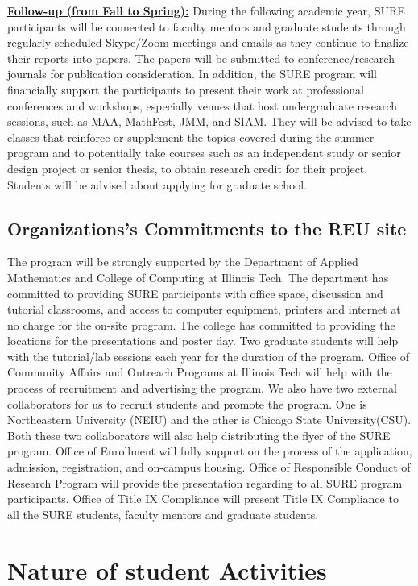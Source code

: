 \documentclass[11pt]{NSFamsart}
\begin{document}
\noindent\textbf{\underline{Follow-up (from Fall to Spring):}} During the following academic year, SURE participants will be connected to faculty mentors and graduate students through regularly scheduled Skype/Zoom meetings and emails as they continue to finalize their reports into papers. The papers will be submitted to conference/research journals for publication consideration. In addition, the SURE program will financially support the participants to present their work at professional conferences and workshops, especially venues that host undergraduate research sessions, such as MAA, MathFest, JMM, and SIAM. They will be advised to take classes that reinforce or supplement the topics covered during the summer program and to potentially take courses such as an independent study or senior design project or senior thesis, to obtain research credit for their project. Students will be advised about applying for graduate school.

\subsection{Organizations's Commitments to the REU site}
The program will be strongly supported by the Department of Applied Mathematics and College of Computing at Illinois Tech. The department has committed to providing SURE participants with office space, discussion and tutorial classrooms, and access to computer equipment, printers and internet at no charge for the on-site program. The college has committed to providing the locations for the presentations and poster day. Two graduate students will help with the tutorial/lab sessions each year for the duration of the program. Office of Community Affairs and Outreach Programs at Illinois Tech will help with the process of recruitment and advertising the program.
We also have two external collaborators for us to recruit students and promote the program. One is Northeastern University (NEIU) and the other is Chicago State University(CSU). Both these two collaborators will also help distributing the flyer of the SURE program.  
Office of Enrollment will fully support on the process of the application, admission, registration, and on-campus housing. 
Office of Responsible Conduct of Research  Program will provide the presentation regarding  to all SURE program participants. Office of Title IX Compliance will present Title IX Compliance to all the SURE students, faculty mentors and graduate students.

\section{Nature of student Activities}
\end{document}
